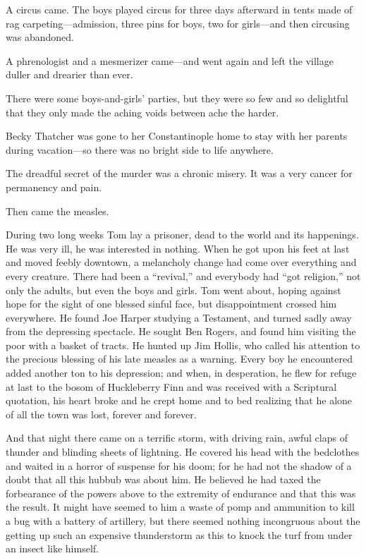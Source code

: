 \documentclass{book}
\begin{document}
A circus came. The boys played circus for three days afterward in tents made of rag carpeting—admission, three pins for boys, two for girls—and then circusing was abandoned.

A phrenologist and a mesmerizer came—and went again and left the village duller and drearier than ever.

There were some boys-and-girls’ parties, but they were so few and so delightful that they only made the aching voids between ache the harder.

Becky Thatcher was gone to her Constantinople home to stay with her parents during vacation—so there was no bright side to life anywhere.

The dreadful secret of the murder was a chronic misery. It was a very cancer for permanency and pain.

Then came the measles.

During two long weeks Tom lay a prisoner, dead to the world and its happenings. He was very ill, he was interested in nothing. When he got upon his feet at last and moved feebly downtown, a melancholy change had come over everything and every creature. There had been a “revival,” and everybody had “got religion,” not only the adults, but even the boys and girls. Tom went about, hoping against hope for the sight of one blessed sinful face, but disappointment crossed him everywhere. He found Joe Harper studying a Testament, and turned sadly away from the depressing spectacle. He sought Ben Rogers, and found him visiting the poor with a basket of tracts. He hunted up Jim Hollis, who called his attention to the precious blessing of his late measles as a warning. Every boy he encountered added another ton to his depression; and when, in desperation, he flew for refuge at last to the bosom of Huckleberry Finn and was received with a Scriptural quotation, his heart broke and he crept home and to bed realizing that he alone of all the town was lost, forever and forever.

And that night there came on a terrific storm, with driving rain, awful claps of thunder and blinding sheets of lightning. He covered his head with the bedclothes and waited in a horror of suspense for his doom; for he had not the shadow of a doubt that all this hubbub was about him. He believed he had taxed the forbearance of the powers above to the extremity of endurance and that this was the result. It might have seemed to him a waste of pomp and ammunition to kill a bug with a battery of artillery, but there seemed nothing incongruous about the getting up such an expensive thunderstorm as this to knock the turf from under an insect like himself.
\end{document}
